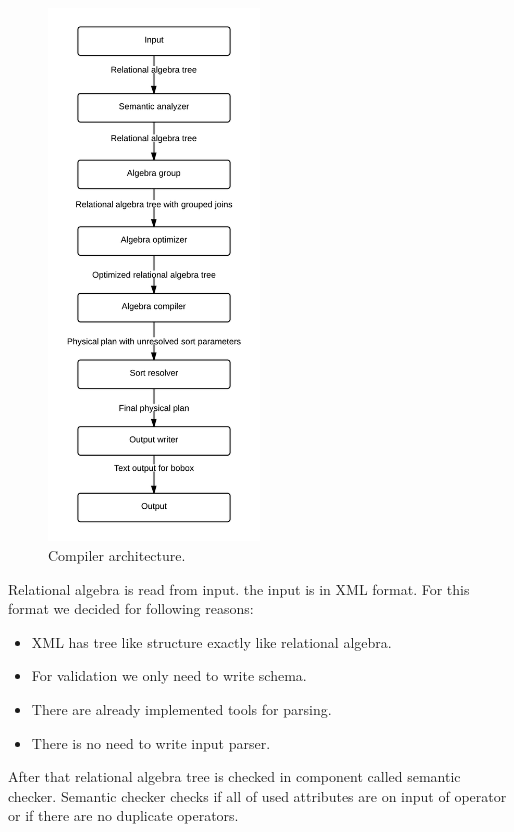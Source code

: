 \begin{figure}[h!]
  \centering
    \includegraphics[width=0.5\textwidth]{compilerarchitecture}

      \caption{Compiler architecture.}
          \label{fig:compilerarchitecture}
\end{figure}

Relational algebra is read from input. the input is in XML format. For this format we decided for following reasons:
\begin{itemize}
\item XML has tree like structure exactly like relational algebra.
\item For validation we only need to write schema.
\item There are already implemented tools for parsing.
\item There is no need to write input parser.
\end{itemize}

After that relational algebra tree is checked in component called semantic checker. Semantic checker checks if all of used attributes are on input of operator or if there are no duplicate operators. 


